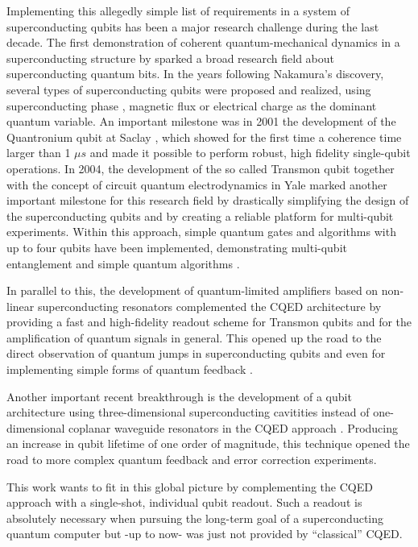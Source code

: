 Implementing this allegedly simple list of requirements in a system of superconducting qubits has been a major research challenge during the last decade. The first demonstration of coherent quantum-mechanical dynamics in a superconducting structure by \cite{Nakamura} sparked a broad research field about superconducting quantum bits. In the years following Nakamura's discovery, several types of superconducting qubits were proposed and realized, using superconducting phase \cite{PhaseQubits}, magnetic flux \cite{FluxQubits} or electrical charge \cite{ChargeQubits} as the dominant quantum variable. An important milestone was in 2001 the development of the Quantronium qubit at Saclay \cite{Quantronium}, which showed for the first time a coherence time larger than 1 $\mu s$ and made it possible to perform robust, high fidelity single-qubit operations. In 2004, the development of the so called Transmon qubit together with the concept of circuit quantum electrodynamics in Yale \cite{WallraffCQED} marked another important milestone for this research field by drastically simplifying the design of the superconducting qubits and by creating a reliable platform for multi-qubit experiments. Within this approach, simple quantum gates and algorithms with up to four qubits have been implemented, demonstrating multi-qubit entanglement \cite{2QubitEntanglement,3QubitEntanglement} and simple quantum algorithms \cite{Baur,diCarlo}.

In parallel to this, the development of quantum-limited amplifiers based on non-linear superconducting resonators \cite{Siddiqi} complemented the CQED architecture by providing a fast and high-fidelity readout scheme for Transmon qubits \cite{Metcalfe,Mallet} and for the amplification of quantum signals in general. This opened up the road to the direct observation of quantum jumps in superconducting qubits \cite{Siddigi?} and even for implementing simple forms of quantum feedback \cite{Siddiqi}.

Another important recent breakthrough is the development of a qubit architecture using three-dimensional superconducting cavitities instead of one-dimensional coplanar waveguide resonators in the CQED approach \cite{Yale}. Producing an increase in qubit lifetime of one order of magnitude, this technique opened the road to more complex quantum feedback and error correction experiments.

This work wants to fit in this global picture by complementing the CQED approach with a single-shot, individual qubit readout. Such a readout is absolutely necessary when pursuing the long-term goal of a superconducting quantum computer but -up to now- was just not provided by ``classical'' CQED.

